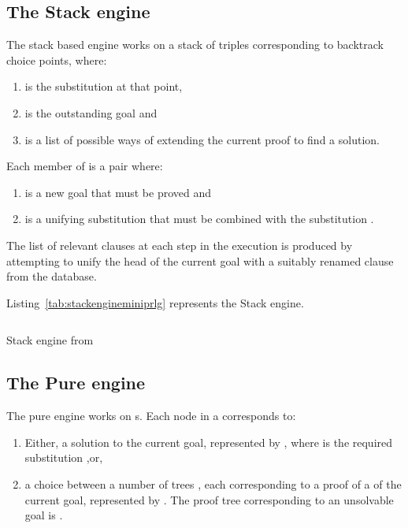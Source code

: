 \documentclass[thesis-solanki.tex]{files}
\begin{document}
\subsection{The Stack engine}
The stack based engine works on a stack of triples 
corresponding to backtrack choice points, where: 
\begin{enumerate}
\item {} is the substitution at that point,

\item {} is the outstanding goal and  

\item {} is a list of possible ways of extending the current proof to find a solution.   
\end{enumerate}
Each member of  is a pair  where: 
\begin{enumerate}
\item {} is a new goal that must be proved and 
\item {} is a unifying substitution that must be combined with the substitution .
\end{enumerate}

The list of relevant clauses at each step in the execution is produced by attempting to unify the head of the current goal with a suitably
renamed clause from the database.

Listing~\ref{tab:stackengineminiprlg} represents the Stack engine.

\begin{code-list}[H]
\begin{singlespace}
\inputminted[linenos, firstline=29, lastline=56]{haskell}{haskell-proto3-sudsy-woe.hs}
\end{singlespace}
\caption{Stack engine from  \cite{website:mini-prolog-hugs98}}
\label{tab:stackengineminiprlg}
\end{code-list}

\subsection{The Pure engine}
The pure engine works on s. Each node in a  corresponds to:
\begin{enumerate}
\item Either, a solution to the current goal, represented by , where  is the required 
 substitution ,or,
 
\item a choice between a number of trees , each corresponding to a proof of a  of the current 
goal, represented by . 
The proof tree corresponding to an unsolvable goal is . 
\end{enumerate}
\end{document}
